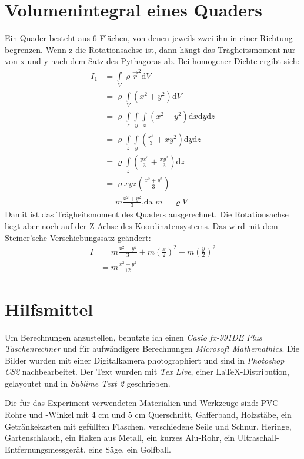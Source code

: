 \section{Volumenintegral eines Quaders}
Ein Quader besteht aus 6 Flächen, von denen jeweils zwei ihn in einer Richtung begrenzen. Wenn z die Rotationsachse ist, dann hängt das Trägheitsmoment nur von x und y nach dem Satz des Pythagoras ab. Bei homogener Dichte ergibt sich:
\begin{align*}
I_1 &=\int\limits_{V}\varrho \vec r^2 \mathrm d V\\
&=\varrho\int\limits_{V} (x^2+y^2) \mathrm d V\\
&=\varrho\int\limits_{z}\int\limits_{y}\int\limits_{x} (x^2+y^2) \mathrm d x \mathrm d y \mathrm d z\\
&=\varrho\int\limits_{z}\int\limits_{y} (\frac{x^3}{3}+xy^2) \mathrm d y \mathrm d z\\
&=\varrho\int\limits_{z} (\frac{yx^3}{3}+\frac{xy^3}{3}) \mathrm d z\\
&=\varrho xyz(\frac{x^2+y^2}{3})\\
&=m\frac{x^2+y^2}{3}\text{,da } m=\varrho V
\end{align*}
Damit ist das Trägheitsmoment des Quaders ausgerechnet. Die Rotationsachse liegt aber noch auf der Z-Achse des Koordinatensystems. Das wird mit dem Steiner'sche Verschiebungssatz geändert:
\begin{align*}
I&=m\frac{x^2+y^2}{3}+m(\frac{x}{2})^2+m(\frac{y}{2})^2\\
&=m\frac{x^2+y^2}{12}
\end{align*}

\section{Hilfsmittel}
Um Berechnungen anzustellen, benutzte ich einen \emph{Casio fx-991DE Plus Taschenrechner} und für aufwändigere Berechnungen \emph{Microsoft Mathemathics}. Die Bilder wurden mit einer Digitalkamera photographiert und sind in \emph{Photoshop CS2} nachbearbeitet. Der Text wurden mit \emph{Tex Live}, einer \LaTeX-Distribution, gelayoutet und in \emph{Sublime Text 2} geschrieben.

Die für das Experiment verwendeten Materialien und Werkzeuge sind: PVC-Rohre und -Winkel mit 4 cm und 5 cm Querschnitt, Gafferband, Holzstäbe, ein Getränkekasten mit gefüllten Flaschen, verschiedene Seile und Schnur, Heringe, Gartenschlauch, ein Haken aus Metall, ein kurzes Alu-Rohr, ein Ultraschall-Entfernungsmessgerät, eine Säge, ein Golfball.

